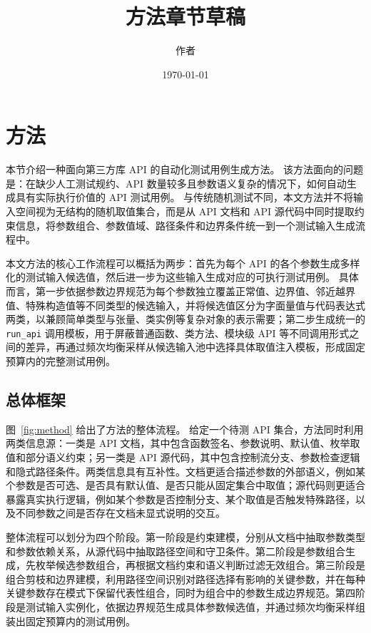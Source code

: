 \documentclass[UTF8,fontset=fandol]{ctexart}
\title{方法章节草稿}
\author{作者}
\date{\today}
\begin{document}
\maketitle

\section{方法}

本节介绍一种面向第三方库 API 的自动化测试用例生成方法。
该方法面向的问题是：在缺少人工测试规约、API 数量较多且参数语义复杂的情况下，如何自动生成具有实际执行价值的 API 测试用例。
与传统随机测试不同，本文方法并不将输入空间视为无结构的随机取值集合，而是从 API 文档和 API 源代码中同时提取约束信息，将参数组合、参数值域、路径条件和边界条件统一到一个测试输入生成流程中。

本文方法的核心工作流程可以概括为两步：首先为每个 API 的各个参数生成多样化的测试输入候选值，然后进一步为这些输入生成对应的可执行测试用例。
具体而言，第一步依据参数边界规范为每个参数独立覆盖正常值、边界值、邻近越界值、特殊构造值等不同类型的候选输入，并将候选值区分为字面量值与代码表达式两类，以兼顾简单类型与张量、类实例等复杂对象的表示需要；第二步生成统一的 \texttt{run\_api} 调用模板，用于屏蔽普通函数、类方法、模块级 API 等不同调用形式之间的差异，再通过频次均衡采样从候选输入池中选择具体取值注入模板，形成固定预算内的完整测试用例。

\subsection{总体框架}

图~\ref{fig:method} 给出了方法的整体流程。
给定一个待测 API 集合，方法同时利用两类信息源：一类是 API 文档，其中包含函数签名、参数说明、默认值、枚举取值和部分语义约束；另一类是 API 源代码，其中包含控制流分支、参数检查逻辑和隐式路径条件。两类信息具有互补性。文档更适合描述参数的外部语义，例如某个参数是否可选、是否具有默认值、是否只能从固定集合中取值；源代码则更适合暴露真实执行逻辑，例如某个参数是否控制分支、某个取值是否触发特殊路径，以及不同参数之间是否存在文档未显式说明的交互。

整体流程可以划分为四个阶段。第一阶段是约束建模，分别从文档中抽取参数类型和参数依赖关系，从源代码中抽取路径空间和守卫条件。第二阶段是参数组合生成，先枚举候选参数组合，再根据文档约束和语义判断过滤无效组合。第三阶段是组合剪枝和边界建模，利用路径空间识别对路径选择有影响的关键参数，并在每种关键参数存在模式下保留代表性组合，同时为组合中的参数生成边界规范。第四阶段是测试输入实例化，依据边界规范生成具体参数候选值，并通过频次均衡采样组装出固定预算内的测试用例。
\end{document}
